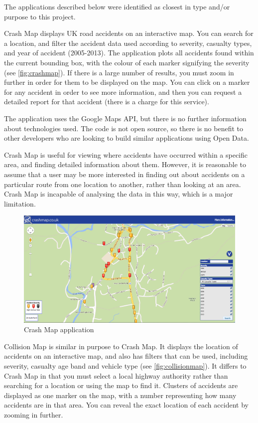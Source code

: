 \documentclass[authoryearcitations]{UoYCSproject}
\begin{document}
The applications described below were identified as closest in type and/or purpose to this project.
 
Crash Map \citep{crashmap} displays UK road accidents on an interactive map. You can search for a location, and filter the accident data used according to severity, casualty types, and year of accident (2005-2013). The application plots all accidents found within the current bounding box, with the colour of each marker signifying the severity (see \autoref{fig:crashmap}). If there is a large number of results, you must zoom in further in order for them to be displayed on the map. You can click on a marker for any accident in order to see more information, and then you can request a detailed report for that accident (there is a charge for this service).

The application uses the Google Maps API, but there is no further information about technologies used. The code is not open source, so there is no benefit to other developers who are looking to build similar applications using Open Data. 

Crash Map is useful for viewing where accidents have occurred within a specific area, and finding detailed information about them. However, it is reasonable to assume that a user may be more interested in finding out about accidents on a particular route from one location to another, rather than looking at an area. Crash Map is incapable of analysing the data in this way, which is a major limitation.

\begin{figure}
	\center
	\includegraphics[scale=0.25]{crashmap}
	\caption{Crash Map application}
	\label{fig:crashmap}
\end{figure}

Collision Map \citep{DepartmentforTransport} is similar in purpose to Crash Map. It displays the location of accidents on an interactive map, and also has filters that can be used, including severity, casualty age band and vehicle type (see \autoref{fig:collisionmap}). It differs to Crash Map in that you must select a local highway authority rather than searching for a location or using the map to find it. Clusters of accidents are displayed as one marker on the map, with a number representing how many accidents are in that area. You can reveal the exact location of each accident by zooming in further.
\end{document}
